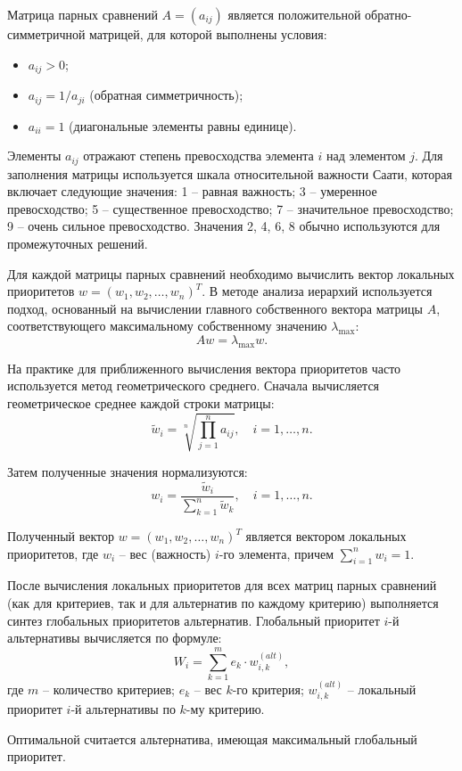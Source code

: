 Матрица парных сравнений $A = (a_{ij})$ является положительной обратно-симметричной матрицей, для которой выполнены условия:
\begin{itemize}
    \item $a_{ij} > 0$;
    \item $a_{ij} = 1/a_{ji}$ (обратная симметричность);
    \item $a_{ii} = 1$ (диагональные элементы равны единице).
\end{itemize}

Элементы $a_{ij}$ отражают степень превосходства элемента $i$ над элементом $j$. Для заполнения матрицы используется шкала относительной важности Саати, которая включает следующие значения: 1 -- равная важность; 3 -- умеренное превосходство; 5 -- существенное превосходство; 7 -- значительное превосходство; 9 -- очень сильное превосходство. Значения 2, 4, 6, 8 обычно используются для промежуточных решений.


Для каждой матрицы парных сравнений необходимо вычислить вектор локальных приоритетов $w = (w_1, w_2, \ldots, w_n)^T$. В методе анализа иерархий используется подход, основанный на вычислении главного собственного вектора матрицы $A$, соответствующего максимальному собственному значению $\lambda_{\max}$:
\[
A w = \lambda_{\max} w.
\]

На практике для приближенного вычисления вектора приоритетов часто используется метод геометрического среднего. Сначала вычисляется геометрическое среднее каждой строки матрицы:
\[
\tilde{w}_i = \sqrt[n]{\prod_{j=1}^{n} a_{ij}}, \quad i = 1, \ldots, n.
\]

Затем полученные значения нормализуются:
\[
w_i = \frac{\tilde{w}_i}{\sum_{k=1}^{n} \tilde{w}_k}, \quad i = 1, \ldots, n.
\]

Полученный вектор $w = (w_1, w_2, \ldots, w_n)^T$ является вектором локальных приоритетов, где $w_i$ -- вес (важность) $i$-го элемента, причем $\sum_{i=1}^{n} w_i = 1$.



После вычисления локальных приоритетов для всех матриц парных сравнений (как для критериев, так и для альтернатив по каждому критерию) выполняется синтез глобальных приоритетов альтернатив. Глобальный приоритет $i$-й альтернативы вычисляется по формуле:
\[
W_i = \sum_{k=1}^{m} e_k \cdot w_{i,k}^{(alt)},
\]
где $m$ -- количество критериев; $e_k$ -- вес $k$-го критерия; $w_{i,k}^{(alt)}$ -- локальный приоритет $i$-й альтернативы по $k$-му критерию.

Оптимальной считается альтернатива, имеющая максимальный глобальный приоритет.


